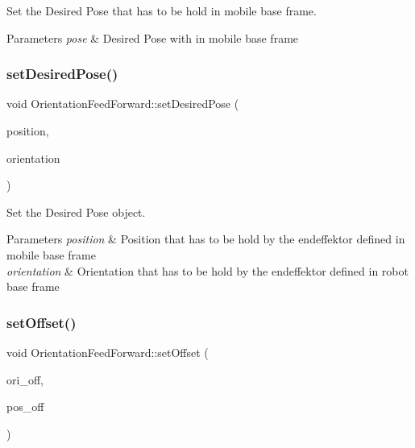 Set the Desired Pose that has to be hold in mobile base frame. 


\begin{DoxyParams}{Parameters}
{\em pose} & Desired Pose with in mobile base frame \\
\hline
\end{DoxyParams}
\mbox{\label{classOrientationFeedForward_ad419aebf0df88282ca6c1dc24adbadb2}} 
\subsubsection{\texorpdfstring{set\+Desired\+Pose()}{setDesiredPose()}\hspace{0.1cm}{\footnotesize\ttfamily [2/2]}}
{\footnotesize\ttfamily void Orientation\+Feed\+Forward\+::set\+Desired\+Pose (\begin{DoxyParamCaption}\item[{Position}]{position,  }\item[{Orientation}]{orientation }\end{DoxyParamCaption})}



Set the Desired Pose object. 


\begin{DoxyParams}{Parameters}
{\em position} & Position that has to be hold by the endeffektor defined in mobile base frame \\
\hline
{\em orientation} & Orientation that has to be hold by the endeffektor defined in robot base frame \\
\hline
\end{DoxyParams}
\mbox{\label{classOrientationFeedForward_a0ff81c38575a903c4d54d1f84abc8c66}} 
\subsubsection{\texorpdfstring{set\+Offset()}{setOffset()}}
{\footnotesize\ttfamily void Orientation\+Feed\+Forward\+::set\+Offset (\begin{DoxyParamCaption}\item[{Orientation}]{ori\+\_\+off,  }\item[{Position}]{pos\+\_\+off }\end{DoxyParamCaption})}



